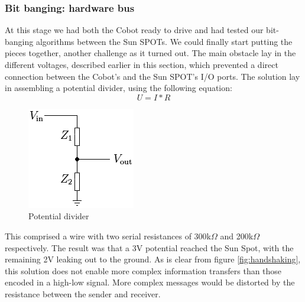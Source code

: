 \documentclass[a4paper,10pt]{article} %
\begin{document}

\subsubsection{Bit banging: hardware bus} %

At this stage we had both the Cobot ready to drive and had tested our
bit-banging algorithms between the Sun SPOTs. We could finally start putting the
pieces together, another challenge as it turned out.  The main obstacle lay in
the different voltages, described earlier in this section, which prevented a
direct connection between the Cobot's and the Sun SPOT's I/O ports. The solution
lay in assembling a potential divider, using the following equation:
\begin{equation} \label{eq:voltage} U = I*R \end{equation}

\begin{figure}[H]
    \label{fig:voltage_divider}
    \centering
    \includegraphics[scale=1]{img/voltage_divider.png}
    \caption{Potential divider}
\end{figure}

This comprised a wire with two serial resistances of 300k$\Omega$ and
200k$\Omega$ respectively. The result was that a 3V potential reached the Sun
Spot, with the remaining 2V leaking out to the ground. As is clear from figure
\ref{fig:handshaking}, this solution does not enable more complex information
transfers than those encoded in a high-low signal. More complex messages would
be distorted by the resistance between the sender and receiver.
\end{document}
